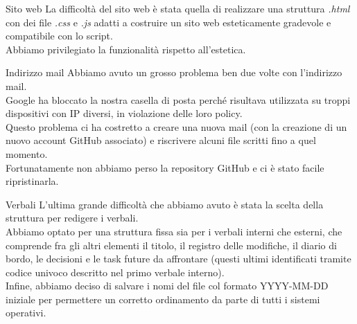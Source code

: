 \documentclass[11pt]{beamer}
\begin{document}
\begin{frame}{Sito web}
	La difficoltà del sito web è stata quella di realizzare una struttura \textit{.html} con dei file \textit{.css} e \textit{.js} adatti a costruire un sito web esteticamente gradevole e compatibile con lo script.\\
	Abbiamo privilegiato la funzionalità rispetto all’estetica.
\end{frame}

\begin{frame}{Indirizzo mail}
	Abbiamo avuto un grosso problema ben due volte con l'indirizzo mail.\\
	Google ha bloccato la nostra casella di posta perché risultava utilizzata su troppi dispositivi con IP diversi, in violazione delle loro policy.\\
	Questo problema ci ha costretto a creare una nuova mail (con la creazione di un nuovo account GitHub associato) e riscrivere alcuni file scritti fino a quel momento.\\
	Fortunatamente non abbiamo perso la repository GitHub e ci è stato facile ripristinarla.
\end{frame}

\begin{frame}{Verbali}
	L'ultima grande difficoltà che abbiamo avuto è stata la scelta della struttura per redigere i verbali.\\
	Abbiamo optato per una struttura fissa sia per i verbali interni che esterni, che comprende fra gli altri elementi il titolo, il registro delle modifiche, il diario di bordo, le decisioni e le task future da affrontare (questi ultimi identificati tramite codice univoco descritto nel primo verbale interno).\\
	Infine, abbiamo deciso di salvare i nomi del file col formato YYYY-MM-DD iniziale per permettere un corretto ordinamento da parte di tutti i sistemi operativi.
\end{frame}
\end{document}

